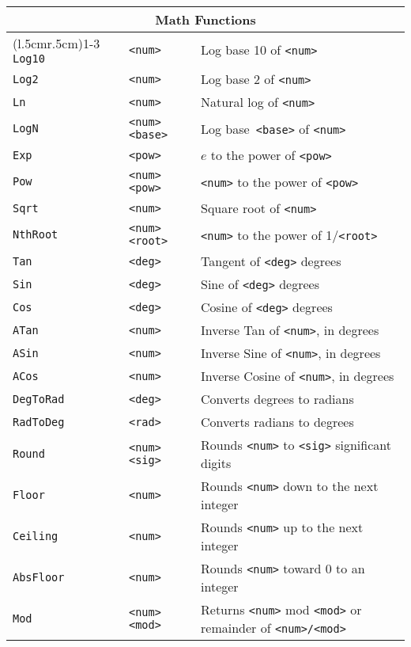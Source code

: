 \begin{longtable}{p{3cm}p{3cm}p{6cm}}
\multicolumn{3}{c}{\textbf{Math Functions}}\\
\cmidrule(l{.5cm}r{.5cm}){1-3}
\texttt{Log10}   &\verb+<num>+         &Log base 10 of \verb+<num>+\\
\texttt{Log2}    &\verb+<num>+         &Log base 2 of \verb+<num>+ \\
\texttt{Ln}      &\verb+<num>+         &Natural log of \verb+<num>+\\
\texttt{LogN}    &\verb+<num> <base>+ &Log base\verb+ <base>+ of \verb+<num>+\\
\texttt{Exp}     &\verb+<pow>+         &$e$ to the power of \verb+<pow>+ \\
\texttt{Pow}     &\verb+<num> <pow>+   &\verb+<num>+ to the power of \verb+<pow>+\\
\texttt{Sqrt}    &\verb+<num>+         &Square root of \verb+<num>+\\
\texttt{NthRoot} &\verb+<num> <root>+  &\verb+<num>+ to the power of 1/\verb+<root>+\\
\texttt{Tan}     &\verb+<deg>+         &Tangent of \verb+<deg>+ degrees \\
\texttt{Sin}     &\verb+<deg>+         &Sine of \verb+<deg>+ degrees \\
\texttt{Cos}     &\verb+<deg>+         &Cosine of \verb+<deg>+ degrees \\
\texttt{ATan}    &\verb+<num>+         &Inverse Tan of \verb+<num>+, in degrees\\
\texttt{ASin}    &\verb+<num>+         &Inverse Sine of \verb+<num>+, in degrees\\
\texttt{ACos}    &\verb+<num>+         &Inverse Cosine of \verb+<num>+, in degrees\\
\texttt{DegToRad}&\verb+<deg>+         &Converts degrees to radians\\
\texttt{RadToDeg}&\verb+<rad>+         &Converts radians to degrees\\
\texttt{Round}   &\verb+<num> <sig>+   &Rounds \verb+<num>+ to \verb+<sig>+ significant digits\\
\texttt{Floor}   &\verb+<num>+         &Rounds \verb+<num>+ down to the next integer\\
\texttt{Ceiling} &\verb+<num>+         &Rounds \verb+<num>+ up to the next integer\\
\texttt{AbsFloor}&\verb+<num>+         &Rounds \verb+<num>+ toward 0 to an integer\\
\texttt{Mod}     &\verb+<num> <mod>+   &Returns \verb+<num>+ mod \verb+<mod>+ or remainder of \verb+<num>/<mod>+ \\ 

\end{longtable}
